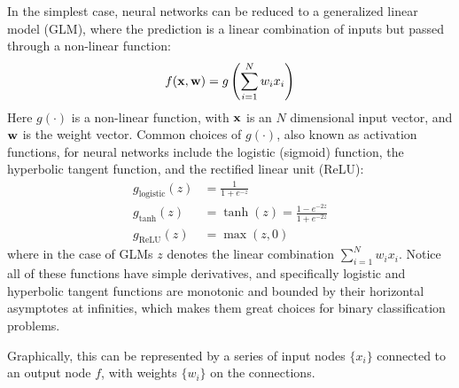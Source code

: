 

In the simplest case, neural networks can be reduced to 
a generalized linear model (GLM),
where the prediction is a linear combination of inputs
but passed through a non-linear function:
%
\begin{equation}
	f(\mathbf{x},\mathbf{w}) = g\left( \sum_{i=1}^N w_i x_i \right)
\end{equation}
%
\indent Here $g(\cdot)$ is a non-linear function, 
with $\mathbf{x}$ is an $N$ dimensional input vector,
and $\mathbf{w}$ is the weight vector.
Common choices of $g(\cdot)$, also known as activation functions,
for neural networks 
include the logistic (sigmoid) function, the hyperbolic tangent function, 
and the rectified linear unit (ReLU):
%
\begin{equation}
\begin{aligned}
	g_{\text{logistic}}(z) &= \frac{1}{1+e^{-z}} \\
	g_{\text{tanh}}(z) &= \tanh(z) = \frac{1 - e^{-2z}}{1 + e^{-2z}}\\
	g_\text{ReLU}(z) &= \max(z,0)
\end{aligned}
\end{equation}
%
where in the case of GLMs $z$ denotes the linear combination
$\sum_{i=1}^N w_i x_i$.
Notice all of these functions have simple derivatives,
and specifically logistic and hyperbolic tangent functions 
are monotonic and bounded by their horizontal asymptotes at infinities,
which makes them great choices for binary classification problems.

Graphically, this can be represented by a series of 
input nodes $\{x_i\}$ connected to an output node $f$,
with weights $\{w_i\}$ on the connections.


